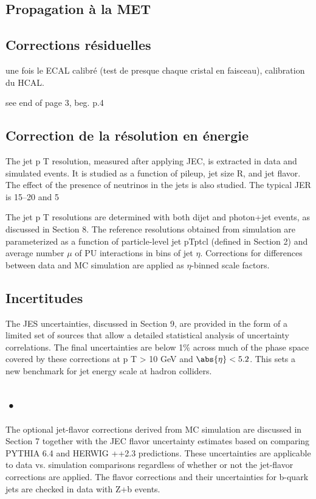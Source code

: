 \subsection{Propagation à la MET}\label{chapter-JERC-section-CMS-subsec-MET}

\subsection{Corrections résiduelles}\label{chapter-JERC-section-CMS-subsec-residuals}
une fois le ECAL calibré (test de presque chaque cristal en faisceau), calibration du HCAL.

see end of page 3, beg. p.4

\subsection{Correction de la résolution en énergie}\label{chapter-JERC-section-CMS-subsec-JER}
The jet p T resolution, measured after applying JEC, is extracted in data and simulated events.
It is studied as a function of pileup, jet size R, and jet flavor. The effect of the presence of
neutrinos in the jets is also studied. The typical JER is 15–20%
and 5%


The jet p T resolutions are determined with both dijet and photon+jet events, as discussed in
Section 8. The reference resolutions obtained from simulation are parameterized as a function
of particle-level jet pTptcl (defined in Section 2) and average number $\mu$ of PU interactions in bins of jet $\eta$.
Corrections for differences between data and MC simulation are applied as
$\eta$-binned scale factors.

\subsection{Incertitudes}\label{chapter-JERC-section-CMS-subsec-unc}
The JES uncertainties, discussed in Section 9, are provided in the form of a limited set of sources
that allow a detailed statistical analysis of uncertainty correlations. The final uncertainties are
below 1\% across much of the phase space covered by these corrections at p T > 10 GeV and
$\abs{\eta} < 5.2$. This sets a new benchmark for jet energy scale at hadron colliders.


\subsection{•}
The optional jet-flavor corrections derived from MC simulation are discussed in Section 7 together with the JEC flavor uncertainty estimates based on comparing PYTHIA 6.4 and HERWIG ++2.3 predictions. These uncertainties are applicable to data vs. simulation comparisons regardless of whether or not the jet-flavor corrections are applied. The flavor corrections and their uncertainties for b-quark jets are checked in data with Z+b events.